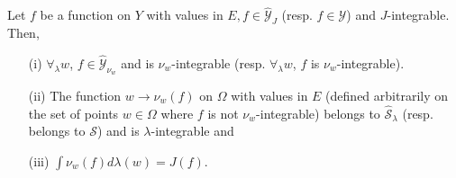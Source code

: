 \begin{thm}[Fubini]\label{part1:chap2:thm20}
Let $f$ be a function on $Y$ with values in $E, f \in
\hat{\mathscr{Y}}_J$ (resp. $f \in \mathscr{Y}$) and
$J$-integrable. Then,
\begin{itemize}
\item[{\rm (i)}] $\forall_\lambda w$, $f \in\hat{\mathscr{Y}}_{\nu_w}$
  and is $\nu_w$-integrable (resp. $\forall_\lambda w$, $f$ is
  $\nu_w$-integrable). 

\item[{\rm (ii)}] The function $w \to \nu_w (f)$ on $\Omega$ with
  values in $E$ (defined arbitrarily on the set of points $w \in
  \Omega$ where $f$ is not $\nu_w$-integrable) belongs to
  $\hat{\mathcal{S}}_\lambda$ (resp. belongs to $\mathcal{S}$) and is
  $\lambda$-integrable  and 

\item[{\rm (iii)}] \qquad $\int \nu_w (f) d\lambda (w) = J(f)$. 
\end{itemize}
\end{thm}

